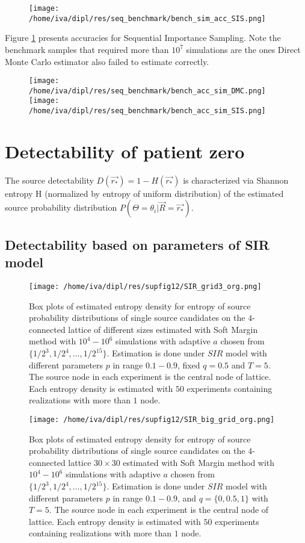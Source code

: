 \documentclass[times, utf8, diplomski]{fer}
\begin{document}
\begin{figure}[H]
\texttt{[image: /home/iva/dipl/res/seq\_benchmark/bench\_sim\_acc\_SIS.png]}
\caption{}
\label{bench_sim_accSIS}
\end{figure}
Figure \ref{bench_sim_accSIS} presents accuracies for Sequential Importance Sampling. Note the benchmark samples that required more than $10^7$ simulations are the ones Direct Monte Carlo estimator also failed to estimate correctly.  

\begin{figure}[H]
\texttt{[image: /home/iva/dipl/res/seq\_benchmark/bench\_acc\_sim\_DMC.png]}
\texttt{[image: /home/iva/dipl/res/seq\_benchmark/bench\_acc\_sim\_SIS.png]}
\caption{}
\label{bench_acc_simDMC}
\end{figure}




\chapter{Detectability of patient zero} 

The source detectability $D(\vec{r_*}) = 1 - H(\vec{r_*})$ is characterized via Shannon entropy H (normalized by entropy of uniform distribution) of the estimated source probability distribution $P(\Theta = \theta_i |\vec{R} = \vec{r_*}).$

\section{Detectability based on parameters of SIR model}
\begin{figure}[H]
\texttt{[image: /home/iva/dipl/res/supfig12/SIR\_grid3\_org.png]}
\caption{Box plots of estimated entropy density for entropy of source probability distributions of 
single source candidates on the $4$-connected lattice of different sizes estimated with Soft Margin method with $10^4 - 10^6$ simulations with adaptive $a$ chosen from $\{1/2^3, 1/2^4, \ldots, 1/2^{15}\}$. Estimation is done under $SIR$ model with different parameters $p$ in range $0.1 - 0.9$, fixed $q = 0.5$ and $T = 5$. The source node in each experiment is the central node of lattice. Each entropy density is estimated with $50$ experiments containing realizations with more than $1$ node.}
\label{network_size}
\end{figure}

\begin{figure}[H]
\texttt{[image: /home/iva/dipl/res/supfig12/SIR\_big\_grid\_org.png]}
\caption{Box plots of estimated entropy density for entropy of source probability distributions of 
single source candidates on the $4$-connected lattice $30 \times 30$ estimated with Soft Margin method with $10^4 - 10^6$ simulations with adaptive $a$ chosen from $\{1/2^3, 1/2^4, \ldots, 1/2^{15}\}$. Estimation is done under $SIR$ model with different parameters $p$ in range $0.1 - 0.9$, and $q = \{0, 0.5, 1\}$ with $T = 5$. The source node in each experiment is the central node of lattice. Each entropy density is estimated with $50$ experiments containing realizations with more than $1$ node.}
\label{entropy_zones}
\end{figure}
\end{document}
